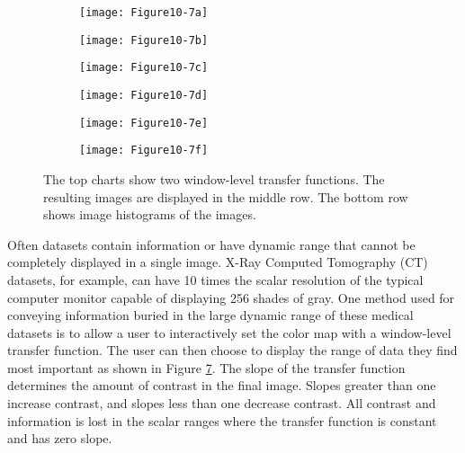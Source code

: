 \begin{figure}[htb]
	\begin{subfigure}[h]{0.48\linewidth}
		\texttt{[image: Figure10-7a]}
		\captionsetup{justification=centering}
		\caption*{}
		\label{fig:Figure10-7a}
	\end{subfigure}
	\hfill
	\begin{subfigure}[h]{0.48\linewidth}
		\texttt{[image: Figure10-7b]}
		\captionsetup{justification=centering}
		\caption*{}
		\label{fig:Figure10-7b}
	\end{subfigure}
	\hfill
	\begin{subfigure}[h]{0.48\linewidth}
		\texttt{[image: Figure10-7c]}
		\captionsetup{justification=centering}
		\caption*{}
		\label{fig:Figure10-7c}
	\end{subfigure}
	\hfill
	\begin{subfigure}[h]{0.48\linewidth}
		\texttt{[image: Figure10-7d]}
		\captionsetup{justification=centering}
		\caption*{}
		\label{fig:Figure10-7d}
	\end{subfigure}
	\hfill
	\begin{subfigure}[h]{0.48\linewidth}
		\texttt{[image: Figure10-7e]}
		\captionsetup{justification=centering}
		\caption*{}
		\label{fig:Figure10-7e}
	\end{subfigure}
	\hfill
	\begin{subfigure}[h]{0.48\linewidth}
		\texttt{[image: Figure10-7f]}
		\captionsetup{justification=centering}
		\caption*{}
		\label{fig:Figure10-7f}
	\end{subfigure}
	\caption{The top charts show two window-level transfer functions. The resulting images are displayed in the middle row. The bottom row shows image histograms of the images.}\label{fig:Figure10-7}
\end{figure}

Often datasets contain information or have dynamic range that cannot be completely displayed in a single image. X-Ray Computed Tomography (CT) datasets, for example, can have 10 times the scalar resolution of the typical computer monitor capable of displaying 256 shades of gray. One method used for conveying information buried in the large dynamic range of these medical datasets is to allow a user to interactively set the color map with a window-level transfer function. The user can then choose to display the range of data they find most important as shown in Figure \ref{fig:Figure10-7}. The slope of the transfer function determines the amount of contrast in the final image. Slopes greater than one increase contrast, and slopes less than one decrease contrast. All contrast and information is lost in the scalar ranges where the transfer function is constant and has zero slope.

